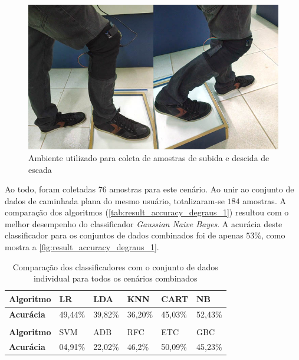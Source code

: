 \begin{figure}[ht]
	\caption{\label{fig:result_poses_degraus}Ambiente utilizado para coleta de amostras de subida e descida de escada}
	\begin{center}
	    \includegraphics[width=.8\textwidth]{resources/result_poses_degraus}
	\end{center}
\end{figure}

Ao todo, foram coletadas \(76\) amostras para este cenário. Ao unir ao conjunto de dados de caminhada plana do mesmo usuário, totalizaram-se \(184\) amostras. A comparação dos algoritmos (\autoref{tab:result_accuracy_degraus_1}) resultou com o melhor desempenho do classificador \textit{Gaussian Naive Bayes}. A acurácia deste classificador para os conjuntos de dados combinados foi de apenas \(53\%\), como mostra a \autoref{fig:result_accuracy_degraus_1}.


\begin{table}[ht]
\caption{Comparação dos classificadores com o conjunto de dados individual para todos os cenários combinados}
\label{tab:result_accuracy_degraus_1}
\begin{tabularx}{\textwidth}{|X|X|X|X|X|X|}
\hline
\textbf{Algoritmo} & LR      & LDA     & KNN     & CART    & NB      \\ \hline
\textbf{Acurácia}  & 49,44\% & 39,82\% & 36,20\% & 45,03\% & 52,43\% \\ \hline
                   &         &         &         &         &         \\ \hline
\textbf{Algoritmo} & SVM     & ADB     & RFC     & ETC     & GBC     \\ \hline
\textbf{Acurácia}  & 04,91\% & 22,02\% & 46,2\%  & 50,09\% & 45,23\% \\ \hline
\end{tabularx}
\end{table}


